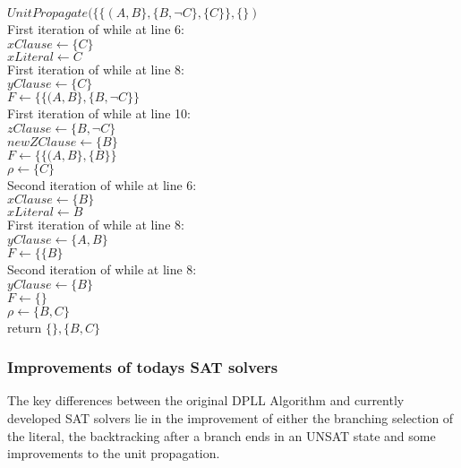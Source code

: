 $UnitPropagate(\{\{(A,B\}, \{B, \lnot C\},\{C\}\}, \{\})$\\
First iteration of while at line 6: \\
$xClause \gets \{C\}$\\
$xLiteral \gets C$\\
First iteration of while at line 8:\\
$yClause \gets \{C\}$\\
$F \gets \{\{(A,B\}, \{B, \lnot C\}\}$\\
First iteration of while at line 10:\\
$zClause \gets \{B, \lnot C\}$ \\
$newZClause \gets \{B\}$\\
$F \gets \{\{(A,B\}, \{B\}\}$ \\
$\rho \gets \{C\}$\\
Second iteration of while at line 6: \\
$xClause \gets \{B\}$\\
$xLiteral \gets B$\\
First iteration of while at line 8:\\
$yClause \gets \{A,B\}$\\
$F \gets \{\{B\}$\\
Second iteration of while at line 8:\\
$yClause \gets \{B\}$\\
$F \gets \{\}$\\
$\rho \gets \{B, C\}$\\
return $\{\}, \{B, C\}$


\subsubsection{Improvements of todays SAT solvers}
The key differences between the original DPLL Algorithm and currently developed SAT solvers lie in the improvement of either the branching selection of the literal, the backtracking after a branch ends in an UNSAT state and some improvements to the unit propagation.
